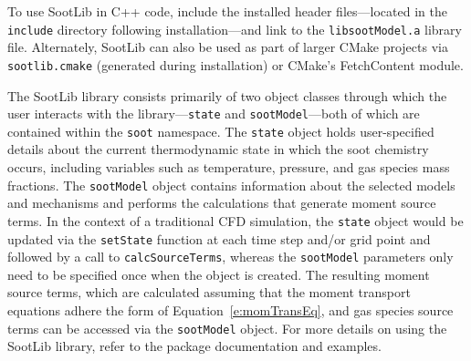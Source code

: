 \documentclass[preprint,letterpaper]{elsarticle}
\begin{document}
To use SootLib in C++ code, include the installed header files---located in the \texttt{include} directory following installation---and link to the \texttt{libsootModel.a} library file. Alternately, SootLib can also be used as part of larger CMake projects via \texttt{sootlib.cmake} (generated during installation) or CMake's FetchContent module.

The SootLib library consists primarily of two object classes through which the user interacts with the library---\texttt{state} and \texttt{sootModel}---both of which are contained within the \texttt{soot} namespace. The \texttt{state} object holds user-specified details about the current thermodynamic state in which the soot chemistry occurs, including variables such as temperature, pressure, and gas species mass fractions. The \texttt{sootModel} object contains information about the selected models and mechanisms and performs the calculations that generate moment source terms. In the context of a traditional CFD simulation, the \texttt{state} object would be updated via the \texttt{setState} function at each time step and/or grid point and followed by a call to \texttt{calcSourceTerms}, whereas the \texttt{sootModel} parameters only need to be specified once when the object is created. The resulting moment source terms, which are calculated assuming that the moment transport equations adhere the form of Equation~\ref{e:momTransEq}, and gas species source terms can be accessed via the \texttt{sootModel} object. For more details on using the SootLib library, refer to the package documentation and examples.
\end{document}
